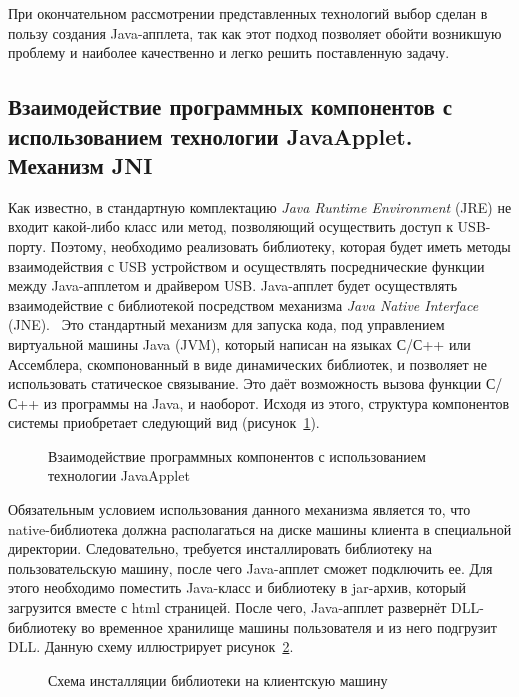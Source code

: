При окончательном рассмотрении представленных технологий выбор сделан в пользу
создания Java-апплета, так как этот подход позволяет обойти возникшую проблему и
наиболее качественно и легко решить поставленную задачу.

\subsection{Взаимодействие программных компонентов с использованием технологии
JavaApplet. Механизм JNI}

Как известно, в стандартную комплектацию \textit{Java Runtime Environment} (JRE)
не входит какой-либо класс или метод, позволяющий осуществить доступ к
USB-порту.
Поэтому, необходимо реализовать библиотеку, которая будет иметь методы
взаимодействия с USB устройством и осуществлять посреднические функции между
Java-апплетом и драйвером USB.
Java-апплет будет осуществлять взаимодействие с библиотекой посредством
механизма \textit{Java Native Interface} (JNE).~\cite{oracle}  Это стандартный
механизм для запуска кода, под управлением виртуальной машины Java (JVM), который написан
на языках С/С++ или Ассемблера,  скомпонованный в виде динамических библиотек, и
позволяет не использовать статическое связывание. Это даёт возможность вызова
функции С/С++ из программы на Java, и наоборот. Исходя из этого, структура
компонентов системы приобретает следующий вид (рисунок~\ref{ris:3.3.3}).

\begin{figure}[h!]
\center{\texttt{[image: 3-3-3]}}
\caption{Взаимодействие программных компонентов с использованием технологии
JavaApplet}
\label{ris:3.3.3}
\end{figure} 

Обязательным условием использования данного механизма является то, что
native-библиотека должна располагаться на диске машины клиента в специальной
директории. Следовательно, требуется инсталлировать библиотеку на
пользовательскую машину, после чего Java-апплет сможет подключить ее. Для этого
необходимо поместить Java-класс и библиотеку в jar-архив, который загрузится
вместе с html страницей. После чего, Java-апплет развернёт DLL-библиотеку во
временное хранилище машины пользователя и из него подгрузит DLL. Данную схему
иллюстрирует рисунок~\ref{ris:3.3.4}.

\begin{figure}[h!]
\center{\texttt{[image: 3-3-4]}}
\caption{Схема инсталляции библиотеки на клиентскую машину}
\label{ris:3.3.4}
\end{figure}  

